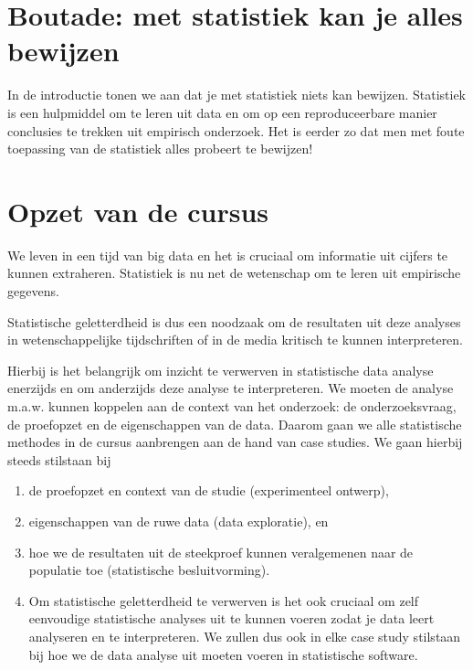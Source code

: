 \documentclass[
  12pt,dutch,coursenotes]{book}
\theoremstyle{definition}
\theoremstyle{definition}
\theoremstyle{definition}
\theoremstyle{definition}
\theoremstyle{remark}
\begin{document}
\hypertarget{boutade-met-statistiek-kan-je-alles-bewijzen}{%
\section{Boutade: met statistiek kan je alles bewijzen}\label{boutade-met-statistiek-kan-je-alles-bewijzen}}

In de introductie tonen we aan dat je met statistiek niets kan bewijzen. Statistiek is een hulpmiddel om te leren uit data en om op een reproduceerbare manier conclusies te trekken uit empirisch onderzoek.
Het is eerder zo dat men met foute toepassing van de statistiek alles probeert te bewijzen!

\hypertarget{opzet-van-de-cursus}{%
\section{Opzet van de cursus}\label{opzet-van-de-cursus}}

We leven in een tijd van big data en het is cruciaal om informatie uit cijfers te kunnen extraheren. Statistiek is nu net de wetenschap om te leren uit empirische gegevens.

Statistische geletterdheid is dus een noodzaak om de resultaten uit deze analyses in wetenschappelijke tijdschriften of in de media kritisch te kunnen interpreteren.

Hierbij is het belangrijk om inzicht te verwerven in statistische data analyse enerzijds en om anderzijds deze analyse te interpreteren. We moeten de analyse m.a.w. kunnen koppelen aan de context van het onderzoek: de onderzoeksvraag, de proefopzet en de eigenschappen van de data.
Daarom gaan we alle statistische methodes in de cursus aanbrengen aan de hand van case studies.
We gaan hierbij steeds stilstaan bij

\begin{enumerate}
\def\labelenumi{\arabic{enumi}.}
\item
  de proefopzet en context van de studie (experimenteel ontwerp),
\item
  eigenschappen van de ruwe data (data exploratie), en
\item
  hoe we de resultaten uit de steekproef kunnen veralgemenen naar de populatie toe (statistische besluitvorming).
\item
  Om statistische geletterdheid te verwerven is het ook cruciaal om zelf eenvoudige statistische analyses uit te kunnen voeren zodat je data leert analyseren en te interpreteren. We zullen dus ook in elke case study stilstaan bij hoe we de data analyse uit moeten voeren in statistische software.
\end{enumerate}
\end{document}
